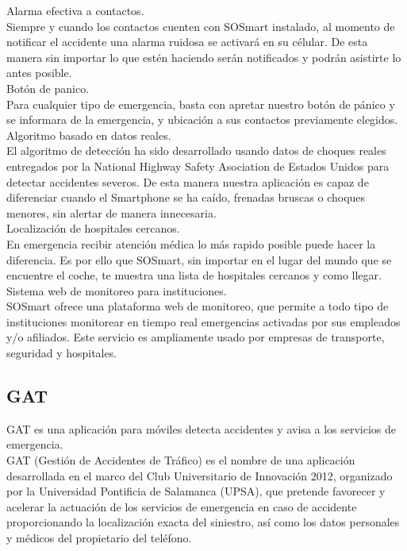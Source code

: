 Alarma efectiva a contactos.\\
Siempre y cuando los contactos cuenten con SOSmart instalado, al momento de notificar el accidente una alarma ruidosa se activará en su célular. De esta manera sin importar lo que estén haciendo serán notificados y podrán asistirte lo antes posible.\\

Botón de panico.\\
Para cualquier tipo de emergencia, basta con apretar nuestro botón de pánico y se informara de la emergencia, y ubicación a sus contactos previamente elegidos.\\


Algoritmo basado en datos reales.\\
El algoritmo de detección ha sido desarrollado usando datos de choques reales entregados por la National Highway Safety Asociation de Estados Unidos para detectar accidentes severos.  De esta manera nuestra aplicación es capaz de diferenciar cuando el Smartphone se ha caído, frenadas bruscas o choques menores, sin alertar de manera innecesaria.\\

Localización de hospitales cercanos.\\
En emergencia recibir atención médica lo más rapido posible puede hacer la diferencia. Es por ello que SOSmart, sin importar en el lugar del mundo que se encuentre el coche, te muestra una lista de hospitales cercanos y como llegar.\\

Sistema web de monitoreo para instituciones.\\
SOSmart ofrece una plataforma web de monitoreo, que permite a todo tipo de instituciones monitorear en tiempo real emergencias activadas por sus empleados y/o afiliados.  Este servicio es ampliamente usado por empresas de transporte, seguridad y hospitales.\\

\subsection{GAT}

GAT es una aplicación para móviles detecta accidentes y avisa a los servicios de emergencia.\\

GAT (Gestión de Accidentes de Tráfico) es el nombre de una aplicación desarrollada en el marco del Club Universitario de Innovación 2012, organizado por la Universidad Pontificia de Salamanca (UPSA), que pretende favorecer y acelerar la actuación de los servicios de emergencia en caso de accidente proporcionando la localización exacta del siniestro, así como los datos personales y médicos del propietario del teléfono.

